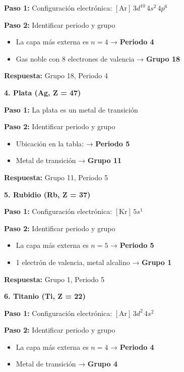 \begin{exercise}
\begin{solu}
        \textbf{Paso 1:} Configuración electrónica: \([\text{Ar}] \, 3d^{10} \, 4s^2 \, 4p^6\)

        \textbf{Paso 2:} Identificar periodo y grupo
        \begin{itemize}
            \item La capa más externa es \(n = 4\) → \textbf{Periodo 4}
            \item Gas noble con 8 electrones de valencia → \textbf{Grupo 18}
        \end{itemize}

        \textbf{Respuesta:} Grupo 18, Periodo 4

        \textbf{4. Plata (Ag, Z = 47)}

        \textbf{Paso 1:} La plata es un metal de transición

        \textbf{Paso 2:} Identificar periodo y grupo
        \begin{itemize}
            \item Ubicación en la tabla: → \textbf{Periodo 5}
            \item Metal de transición → \textbf{Grupo 11}
        \end{itemize}

        \textbf{Respuesta:} Grupo 11, Periodo 5

        \textbf{5. Rubidio (Rb, Z = 37)}

        \textbf{Paso 1:} Configuración electrónica: \([\text{Kr}] \, 5s^1\)

        \textbf{Paso 2:} Identificar periodo y grupo
        \begin{itemize}
            \item La capa más externa es \(n = 5\) → \textbf{Periodo 5}
            \item 1 electrón de valencia, metal alcalino → \textbf{Grupo 1}
        \end{itemize}

        \textbf{Respuesta:} Grupo 1, Periodo 5

        \textbf{6. Titanio (Ti, Z = 22)}

        \textbf{Paso 1:} Configuración electrónica: \([\text{Ar}] \, 3d^2 \, 4s^2\)

        \textbf{Paso 2:} Identificar periodo y grupo
        \begin{itemize}
            \item La capa más externa es \(n = 4\) → \textbf{Periodo 4}
            \item Metal de transición → \textbf{Grupo 4}
        \end{itemize}


\end{solu}
\end{exercise}
